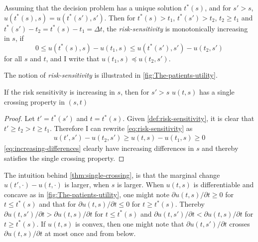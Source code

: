 \documentclass[10pt,a4paper]{article} 					%
\begin{document}
\begin{defn}\label{def:risk-sensitivity}
Assuming that the decision problem has a unique solution $t^{*}(s)$, and for $s'>s$, $u(t^{*}(s),s)=u(t^{*}(s'),s')$. Then for $t^{*}(s)>t_{1}$, $t^{*}(s')>t_{2}$, $t_{2}\ge t_{1}$ and $t^{*}(s')-t_{2}=t^{*}(s)-t_{1}=\Delta t$, the \emph{risk-sensitivity} is monotonically increasing in $s$, if
\[
	0\le u(t^{*}(s),s)-u(t_{1},s)\le u(t^{*}(s'),s')-u(t_{2},s')\label{eq:risk-sensitivity}
\]
for all $s$ and $t$, and I write that $u(t_{1},s)\preceq u(t_{2},s')$.
\end{defn}

The notion of \emph{risk-sensitivity} is illustrated in \cref{fig:The-patients-utility}.

\begin{thm}\label{thm:single-crossing}
If the risk sensitivity is increasing in $s$, then for $s'>s$ $u(t,s)$ has a single crossing property in $(s,t)$
\end{thm}

\begin{proof}
Let $t'=t^{*}(s')$ and $t=t^{*}(s)$. Given \cref{def:risk-sensitivity}, it is clear that $t'\ge t_{2}>t\ge t_{1}$. Therefore I can rewrite \cref{eq:risk-sensitivity} as
\begin{align}
  u(t',s')-u(t_{2},s')\ge u(t,s)-u(t_{1},s)\ge0\label{eq:increasing-differences}
\end{align}
\cref{eq:increasing-differences} clearly have increasing differences in $s$ and thereby satisfies the single crossing property.
\end{proof}

The intuition behind \cref{thm:single-crossing}, is that the marginal change $u(t',\cdot)-u(t,\cdot)$ is larger, when $s$ is larger. When $u(t,s)$ is differentiable and concave as in \cref{fig:The-patients-utility}, one might note $\partial u(t,s)/\partial t\ge0$ for $t\le t^{*}(s)$ and that for $\partial u(t,s)/\partial t\le0$ for $t\ge t^{*}(s)$. Thereby $\partial u(t,s')/\partial t>\partial u(t,s)/\partial t$ for $t\le t^{*}(s)$ and $\partial u(t,s')/\partial t<\partial u(t,s)/\partial t$ for $t\ge t^{*}(s)$. If $u(t,s)$ is convex, then one might note that $\partial u(t,s')/\partial t$ crosses $\partial u(t,s)/\partial t$ at most once and from below.
\end{document}
